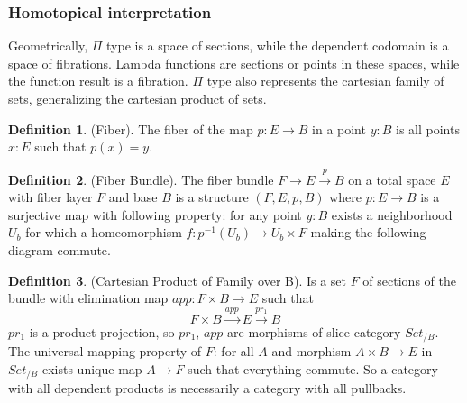 \documentclass[twoside]{article}
\theoremstyle{definition}
\newtheorem{definition}{Definition}
\def\mapright#1{\xrightarrow{{#1}}}
\begin{document}
\subsubsection*{Homotopical interpretation}

Geometrically, $\Pi$ type is a space of sections, while the dependent codomain is a space of fibrations.
Lambda functions are sections or points in these spaces, while the function result is a fibration.
$\Pi$ type also represents the cartesian family of sets, generalizing the cartesian product of sets.

\begin{definition} (Fiber).
The fiber of the map $p: E \rightarrow B$ in a point $y: B$ is all points $x: E$ such that $p(x)=y$.
\end{definition}

\begin{definition} (Fiber Bundle).
The fiber bundle $ F \rightarrow E \mapright{p} B$ on a total space $E$ with fiber layer $F$ and base $B$ is a
structure $(F,E,p,B)$ where $p: E \rightarrow B$ is a surjective map with following property:
for any point $y: B$ exists a neighborhood $U_b$ for which a homeomorphism $f: p^{-1}(U_b) \rightarrow U_b \times F$
making the following diagram commute.
\begin{center}
\end{center}
\end{definition}

\begin{definition} (Cartesian Product of Family over B).
Is a set $F$ of sections of the bundle with elimination map $app : F \times B \rightarrow E$ such that
\begin{equation}
F \times B \mapright{app} E \mapright{pr_1} B
\end{equation}
$pr_1$ is a product projection, so $pr_1$, $app$ are morphisms
of slice category $Set_{/B}$. The universal mapping property of $F$:
for all $A$ and morphism $A \times B \rightarrow E$ in $Set_{/B}$ exists
unique map $A \rightarrow F$ such that everything commute. So a category
with all dependent products is necessarily a category with all pullbacks.
\end{definition}
\end{document}
